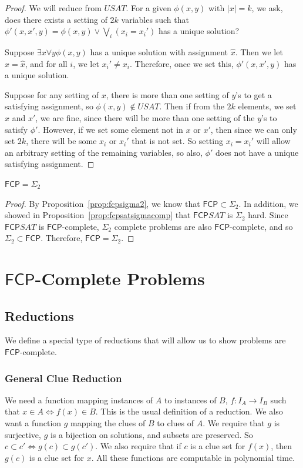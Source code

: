 \documentclass[runningheads,a4paper]{llncs}
\begin{document}
\begin{proof}
We will reduce from $USAT$. For a given $\phi(x, y)$ with $|x| = k$, we ask, does there exists a setting of $2k$ variables such that $\phi'(x, x', y) = \phi(x, y) \vee \bigvee_i (x_i = x_i')$ has a unique solution?

Suppose $\exists x \forall y \phi(x,y)$ has a unique solution with assignment $\hat{x}$. Then we let $x = \hat{x}$, and for all $i$, we let $x_i' \neq x_i$. Therefore, once we set this, $\phi'(x, x', y)$ has a unique solution. 

Suppose for any setting of $x$, there is more than one setting of $y$'s to get a satisfying assignment, so $\phi(x, y) \notin USAT$. Then if from the $2k$ elements, we set $x$ and $x'$, we are fine, since there will be more than one setting of the $y$'s to satisfy $\phi'$. However, if we set some element not in $x$ or $x'$, then since we can only set $2k$, there will be some $x_i$ or $x_i'$ that is not set. So setting $x_i = x_i'$ will allow an arbitrary setting of the remaining variables, so also, $\phi'$ does not have a unique satisfying assignment.
\end{proof}

\begin{theorem}
$\mathsf{FCP} = \Sigma_2$
\end{theorem}

\begin{proof}
By Proposition~\ref{prop:fcpsigma2}, we know that $\mathsf{FCP} \subset \Sigma_2$. In addition, we showed in Proposition~\ref{prop:fcpsatsigmacomp} that $\mathsf{FCP} SAT$ is $\Sigma_2$ hard. Since $\mathsf{FCP} SAT$ is $\mathsf{FCP}$-complete, $\Sigma_2$ complete problems are also $\mathsf{FCP}$-complete, and so $\Sigma_2 \subset \mathsf{FCP}$. Therefore, $\mathsf{FCP} = \Sigma_2$. 
\end{proof}

\section{$\mathsf{FCP}$-Complete Problems}

\subsection{Reductions}

We define a special type of reductions that will allow us to show problems are $\mathsf{FCP}$-complete. 

\subsubsection{General Clue Reduction}
We need a function mapping instances of $A$ to instances of $B$, $f: I_A \rightarrow I_B$ such that $x \in A \iff f(x) \in B$. This is the usual definition of a reduction. We also want a function $g$ mapping the clues of $B$ to clues of $A$. We require that $g$ is surjective, $g$ is a bijection on solutions, and subsets are preserved. So $c \subset c' \iff g(c) \subset g(c')$. We also require that if $c$ is a clue set for $f(x)$, then $g(c)$ is a clue set for $x$. All these functions are computable in polynomial time.
\end{document}

